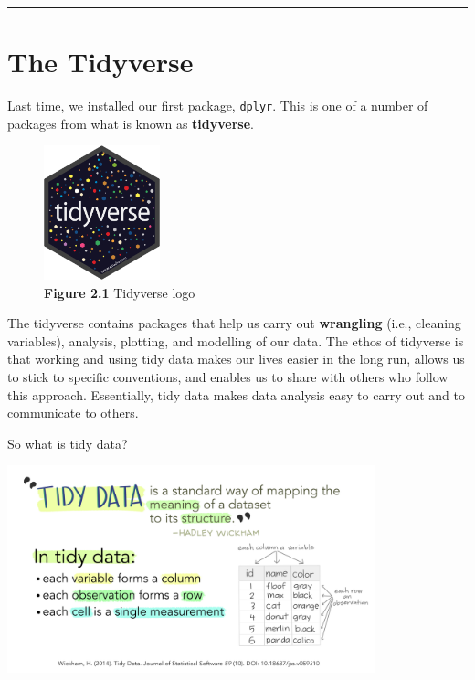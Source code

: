\documentclass[
]{book}
\begin{document}
\begin{center}\rule{0.5\linewidth}{0.5pt}\end{center}

\hypertarget{the-tidyverse}{%
\section{The Tidyverse}\label{the-tidyverse}}

Last time, we installed our first package, \texttt{dplyr}. This is one of a number of packages from what is known as \textbf{tidyverse}.

\begin{figure}
\centering
\includegraphics[width=0.3\textwidth,height=\textheight]{Images/tidyverse-logo.png}
\caption{\textbf{Figure 2.1} Tidyverse logo}
\end{figure}

The tidyverse contains packages that help us carry out \textbf{wrangling} (i.e., cleaning variables), analysis, plotting, and modelling of our data. The ethos of tidyverse is that working and using tidy data makes our lives easier in the long run, allows us to stick to specific conventions, and enables us to share with others who follow this approach. Essentially, tidy data makes data analysis easy to carry out and to communicate to others.

So what is tidy data?

\includegraphics[width=0.8\textwidth,height=\textheight]{Images/tidydata_1.jpg}
\end{document}
